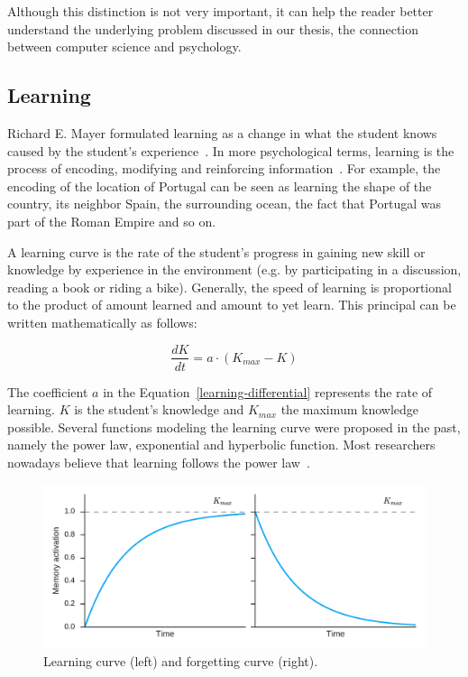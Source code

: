 Although this distinction is not very important, it can help the reader better understand the underlying problem discussed in our thesis, the connection between computer science and psychology.

\subsection{Learning}
\label{learning}

Richard E. Mayer formulated learning as a change in what the student knows caused by the student's experience~\cite{RichardE.Mayer2010}. In more psychological terms, learning is the process of encoding, modifying and reinforcing information~\cite{Lewis}. For example, the encoding of the location of Portugal can be seen as learning the shape of the country, its neighbor Spain, the surrounding ocean, the fact that Portugal was part of the Roman Empire and so on.

A learning curve is the rate of the student's progress in gaining new skill or knowledge by experience in the environment (e.g. by participating in a discussion, reading a book or riding a bike). Generally, the speed of learning is proportional to the product of amount learned and amount to yet learn. This principal can be written mathematically as follows:

\begin{equation} \label{learning-differential}
  \frac{dK}{dt} = a \cdot (K_{max} - K)
\end{equation}

The coefficient $a$ in the Equation~\ref{learning-differential} represents the rate of learning. $K$ is the student's knowledge and $K_{max}$ the maximum knowledge possible. Several functions modeling the learning curve were proposed in the past, namely the power law, exponential and hyperbolic function. Most researchers nowadays believe that learning follows the power law~\cite{Klusasek2014}.

\begin{figure}[htbp]
  \centering
  \includegraphics[width=\textwidth]{img/learning-forgetting-curves}
  \caption{Learning curve (left) and forgetting curve (right).}
  \label{fig:learning-forgetting-curves}
\end{figure}

